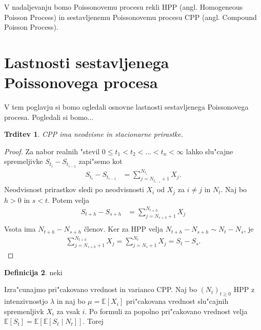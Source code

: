 \documentclass[12pt,a4paper]{amsart}
\theoremstyle{definition} %
\newtheorem{definicija}{Definicija}[section]
\theoremstyle{plain} %
\newtheorem{trditev}[definicija]{Trditev}
\newcommand{\E}{\mathbb{E}}
\newcommand{\1}{\mathds{1}}
\begin{document}
    V nadaljevanju bomo Poissonovemu procesu rekli HPP (angl. Homogeneous Poisson Process) in 
    sestavljenemu Poissonovemu procesu CPP (angl. Compound Poisson Process).

\section{Lastnosti sestavljenega Poissonovega procesa}

    V tem poglavju si bomo ogledali osnovne lastnosti sestavljenega Poissonovega procesa. Pogledali
    si bomo... 
    \begin{trditev}
        CPP ima neodvisne in stacionarne prirastke.
        \label{trd:neodvPrirCPP}
    \end{trditev}

    \begin{proof}
        Za nabor realnih "stevil $0 \leq t_1 < t_2 < \ldots < t_n < \infty$ lahko slu"cajne
        spremeljivke $S_{t_i} - S_{t_{i-1}}$ zapi"semo kot
        \begin{align*}
            S_{t_i} - S_{t_{i-1}} &= \sum_{j=N_{t_{i-1}}+1}^{N_{t_i}} X_j. 
        \end{align*}
        Neodvisnost prirastkov sledi po neodvisnosti $X_i$ od $X_j$ za $i\neq j$ in $N_t$. 
        Naj bo $h > 0$ in $s < t$. Potem velja
        \begin{align*}
            S_{t+h} - S_{s+h} &= \sum_{j=N_{s+h}+1}^{N_{t+h}} X_j \\
        \end{align*}
        Vsota ima $N_{t+h} - N_{s+h}$ členov. Ker za HPP velja 
        $N_{t+h} - N_{s+h} \sim N_t - N_s$, je 
        \begin{align*}
            \sum_{j=N_{s+h}+1}^{N_{t+h}} X_j = \sum_{j=N_{s}+1}^{N_{t}} X_j = S_t - S_s.
        \end{align*}
    \end{proof}

    \begin{definicija}
        neki
    \end{definicija}

    Izra"cunajmo pri"cakovano vrednost in varianco CPP. Naj bo $(N_t)_{t\geq 0}$ HPP z 
    intenzivnostjo $\lambda$ in naj bo $\mu = \E\left[X_i\right]$ pri"cakovana vrednost 
    slu"cajnih spremenljivk $X_i$ za vsak $i$. Po formuli za popolno pri"cakovano vrednost velja 
    $\E\left[S_t\right] = \E\left[\E\left[S_t\mid N_t\right]\right]$. Torej
\end{document}
